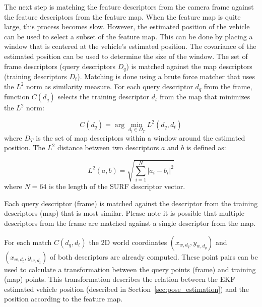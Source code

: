 
The next step is matching the feature descriptors from the camera frame against the feature descriptors from the feature map.
When the feature map is quite large, this process becomes slow.
However, the estimated position of the vehicle can be used to select a subset of the feature map.
This can be done by placing a window that is centered at the vehicle's estimated position.
The covariance of the estimated position can be used to determine the size of the window.
The set of frame descriptors (query descriptors $D_q$) is matched against the map descriptors (training descriptors $D_t$).
Matching is done using a brute force matcher that uses the $L^2$ norm as similarity measure.
For each query descriptor $d_q$ from the frame, function $C(d_q)$ selects the training descriptor $d_t$ from the map that minimizes the $L^2$ norm:


\begin{equation}
C(d_q) = \arg\min_{d_t \in D_T} L^2(d_q, d_t)
\end{equation}
where $D_T$ is the set of map descriptors within a window around the estimated position.
The $L^2$ distance between two descriptors $a$ and $b$ is defined as:

\begin{equation}
L^2(a,b) =\sqrt { \sum_{i=1}^{N} \left| a_i - b_i \right| ^2 }
\end{equation}
where $N = 64$ is the length of the SURF descriptor vector.

Each query descriptor (frame) is matched against the descriptor from the training descriptors (map) that is most similar.
Please note it is possible that multiple descriptors from the frame are matched against a single descriptor from the map.

For each match $C(d_q, d_t)$ the 2D world coordinates $(x_{w, d_q}, y_{w, d_q})$ and $(x_{w, d_t}, y_{w, d_t})$ of both descriptors are already computed.
These point pairs can be used to calculate a transformation between the query points (frame) and training (map) points.
This transformation describes the relation between the EKF estimated vehicle position (described in Section~\ref{sec:pose_estimation}) and the position according to the feature map.

